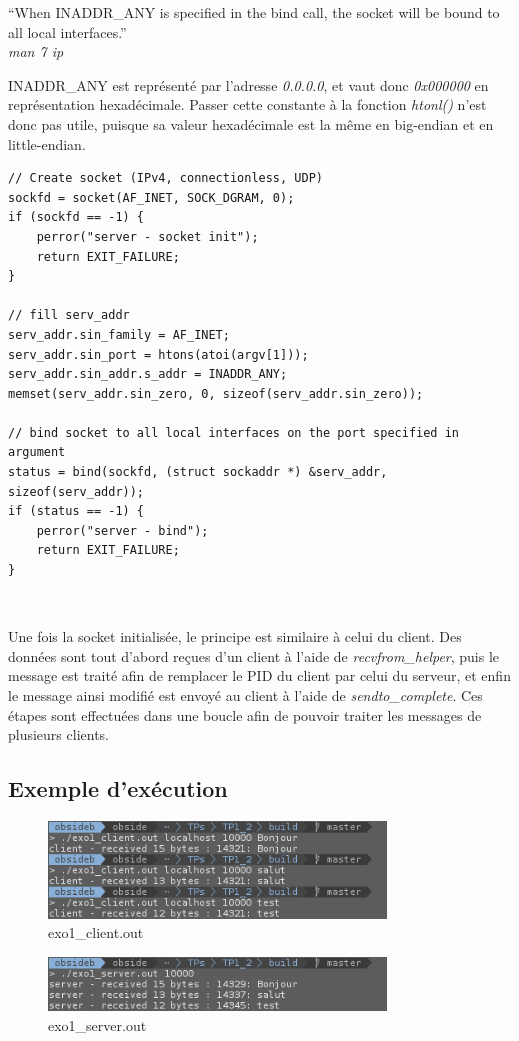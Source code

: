 \begin{mdframed}[backgroundcolor=lightblue, linecolor=darkblue]
``When INADDR\_ANY is specified in the bind call, the  socket will be bound to all local interfaces.''\\
\emph{man 7 ip}
\end{mdframed}

\begin{mdframed}[backgroundcolor=hintbg, linecolor=hintborder]
INADDR\_ANY est représenté par l'adresse \emph{0.0.0.0}, et vaut donc \emph{0x000000} en représentation hexadécimale. Passer cette constante à la fonction \emph{htonl()} n'est donc pas utile, puisque sa valeur hexadécimale est la même en big-endian et en little-endian.
\end{mdframed}
\newpage

\begin{lstlisting}
// Create socket (IPv4, connectionless, UDP)
sockfd = socket(AF_INET, SOCK_DGRAM, 0);
if (sockfd == -1) {
    perror("server - socket init");
    return EXIT_FAILURE;
}

// fill serv_addr
serv_addr.sin_family = AF_INET;
serv_addr.sin_port = htons(atoi(argv[1]));
serv_addr.sin_addr.s_addr = INADDR_ANY;
memset(serv_addr.sin_zero, 0, sizeof(serv_addr.sin_zero));

// bind socket to all local interfaces on the port specified in argument
status = bind(sockfd, (struct sockaddr *) &serv_addr, sizeof(serv_addr));
if (status == -1) {
    perror("server - bind");
    return EXIT_FAILURE;
}
\end{lstlisting}
\

Une fois la socket initialisée, le principe est similaire à celui du client. Des données sont tout d'abord reçues d'un client à l'aide de \emph{recvfrom\_helper}, puis le message est traité afin de remplacer le PID du client par celui du serveur, et enfin le message ainsi modifié est envoyé au client à l'aide de \emph{sendto\_complete}. Ces étapes sont effectuées dans une boucle afin de pouvoir traiter les messages de plusieurs clients.

\subsection{Exemple d'exécution}
\begin{figure}[h!]
	\centering
	\includegraphics[width=0.8\textwidth]{screenshots/ex1_client.png}
	\caption{exo1\_client.out}
\end{figure}

\begin{figure}[h!]
	\centering
	\includegraphics[width=0.8\textwidth]{screenshots/ex1_server.png}
	\caption{exo1\_server.out}
\end{figure}
